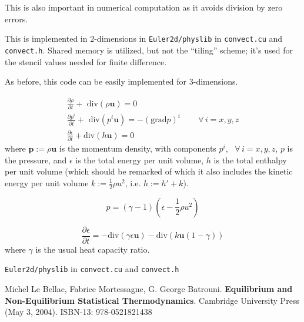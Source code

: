 \documentclass[10pt, landscape]{amsart}
\begin{document}
This is also important in numerical computation as it avoids division by zero errors.

This is implemented in 2-dimensions in \verb|Euler2d/physlib| in \verb|convect.cu| and \verb|convect.h|.  Shared memory is utilized, but not the ``tiling'' scheme; it's used for the stencil values needed for finite difference.

As before, this code can be easily implemented for 3-dimensions.  

\pagebreak
{\huge
\[
\begin{gathered}
  \frac{ \partial \rho }{ \partial t} + \text{ div}( \rho \mathbf{u} ) = 0 \\ 
  \frac{ \partial p^i }{ \partial t} + \text{ div}( p^i \mathbf{u} ) = - (\text{grad}p)^i \qquad \, \forall \, i = x,y,z \\
  \frac{ \partial \epsilon}{ \partial t} + \text{div}( h \mathbf{u} ) = 0
  \end{gathered}
 \]
where $\mathbf{p} := \rho \mathbf{u}$ is the momentum density, with components $p^i$, \, $\forall \, i = x,y,z$, $p$ is the pressure, and $\epsilon$ is the total energy per unit volume, $h$ is the total enthalpy per unit volume (which should be remarked of which it also includes the kinetic energy per unit volume $k:= \frac{1}{2} \rho u^2$, i.e. $h := h' + k$).

\[
p = (\gamma - 1) (\epsilon - \frac{1}{2} \rho u^2)
\]

\[
\frac{ \partial \epsilon }{ \partial t} = -\text{div}(\gamma \epsilon \mathbf{u}) - \text{div}(k\mathbf{u}(1-\gamma ) )
\]
where $\gamma$ is the usual heat capacity ratio.  

\verb|Euler2d/physlib| in \verb|convect.cu| and \verb|convect.h|
}
\pagebreak

\begin{thebibliography}{9}
Michel Le Bellac, Fabrice Mortessagne, G. George Batrouni.  \textbf{Equilibrium and Non-Equilibrium Statistical Thermodynamics}.  Cambridge University Press (May 3, 2004).  ISBN-13: 978-0521821438

\end{thebibliography}
\end{document}
